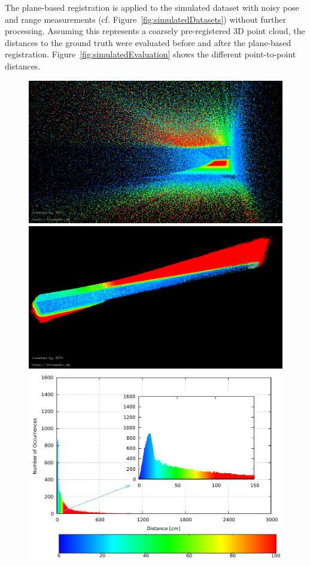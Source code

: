 \documentclass[5p]{elsarticle}
\begin{document}
The plane-based registration is applied to the simulated dataset with noisy pose and range measurements (cf. Figure~\ref{fig:simulatedDatasets}) without further processing.
Assuming this represents a coarsely pre-registered 3D point cloud, the distances to the ground truth were evaluated before and after the plane-based registration. 
Figure~\ref{fig:simulatedEvaluation} shows the different point-to-point distances. 

\begin{figure}
 	\centering
 	\begin{minipage}[c]{0.495\textwidth}
 		\centering
		\includegraphics[width=\textwidth]{./images/uncorr_bottom_pose}\\
		\includegraphics[width=\textwidth]{./images/uncorr_side_view}\\
  		\includegraphics[width=\textwidth]{./images/uncorr_hist}

\end{minipage}
\end{figure}
\end{document}
